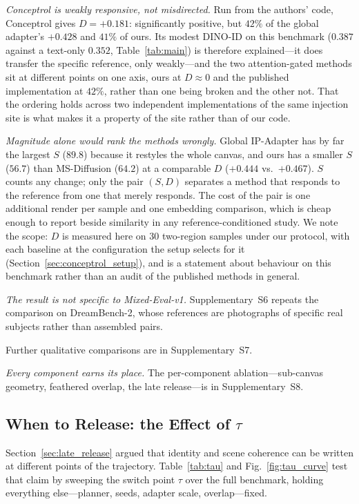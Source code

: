 \documentclass[review,10pt,times]{elsarticle}
\begin{document}
\noindent\textit{Conceptrol is weakly responsive, not misdirected.}
Run from the authors' code, Conceptrol gives $D=+0.181$: significantly
positive, but $42\%$ of the global adapter's $+0.428$ and $41\%$ of ours.  Its
modest DINO-ID on this benchmark ($0.387$ against a text-only $0.352$,
Table~\ref{tab:main}) is therefore explained---it does transfer the specific
reference, only weakly---and the two attention-gated methods sit at different
points on one axis, ours at $D\!\approx\!0$ and the published implementation
at $42\%$, rather than one being broken and the other not.  That the ordering
holds across two independent implementations of the same injection site is
what makes it a property of the site rather than of our code.

\noindent\textit{Magnitude alone would rank the methods wrongly.}
Global IP-Adapter has by far the largest $S$ ($89.8$) because it restyles the
whole canvas, and ours has a smaller $S$ ($56.7$) than MS-Diffusion ($64.2$)
at a comparable $D$ ($+0.444$ vs.\ $+0.467$).  $S$ counts any change; only the
pair $(S,D)$ separates a method that responds to the reference from one that
merely responds.  The cost of the pair is one additional render per sample and
one embedding comparison, which is cheap enough to report beside similarity in
any reference-conditioned study.  We note the scope: $D$ is measured here on
30 two-region samples under our protocol, with each baseline at the
configuration the setup selects for it (Section~\ref{sec:conceptrol_setup}),
and is a statement about behaviour on this benchmark rather than an audit of
the published methods in general.

\noindent\textit{The result is not specific to Mixed-Eval-v1.}
Supplementary~S6 repeats the comparison on DreamBench-2, whose references are
photographs of specific real subjects rather than assembled pairs.


Further qualitative comparisons are in Supplementary~S7.


\noindent\textit{Every component earns its place.}
The per-component ablation---sub-canvas geometry, feathered overlap, the late
release---is in Supplementary~S8.


\subsection{When to Release: the Effect of $\tau$}
\label{sec:tau}

Section~\ref{sec:late_release} argued that identity and scene coherence
can be written at different points of the trajectory.  Table~\ref{tab:tau}
and Fig.~\ref{fig:tau_curve} test that claim by sweeping the switch point
$\tau$ over the full benchmark, holding everything else---planner, seeds,
adapter scale, overlap---fixed.
\end{document}

